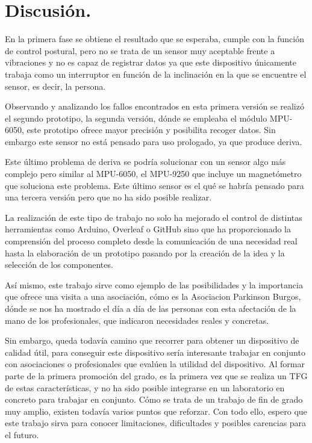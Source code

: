 \section{Discusión.}

En la primera fase se obtiene el resultado que se esperaba, cumple con la función de control postural, pero no se trata de un sensor muy aceptable frente a vibraciones y no es capaz de registrar datos ya que este dispositivo únicamente trabaja como un interruptor en función de la inclinación en la que se encuentre el sensor, es decir, la persona.

Observando y analizando los fallos encontrados en esta primera versión se realizó el segundo prototipo, la segunda versión, dónde se empleaba el módulo MPU-6050\cite{MPU6050_1,MPU6050_2}, este prototipo ofrece mayor precisión y posibilita recoger datos. Sin embargo este sensor no está pensado para uso prologado, ya que produce deriva.

Este último problema de deriva se podría solucionar con un sensor algo más complejo pero similar al MPU-6050, el MPU-9250\cite{MPU9250_1,MPU9250_2} que incluye un magnetómetro que soluciona este problema. Este último sensor es el qué se habría pensado para una tercera versión pero que no ha sido posible realizar.

La realización de este tipo de trabajo no solo ha mejorado el control de distintas herramientas como Arduino, Overleaf o GitHub sino que ha proporcionado la comprensión del proceso completo desde la comunicación de una necesidad real hasta la elaboración de un prototipo pasando por la creación de la idea y la selección de los componentes.

Así mismo, este trabajo sirve como ejemplo de las posibilidades y la importancia que ofrece una visita a una asociación, cómo es la Asociacion Parkinson Burgos\cite{ParkinsonBurgos}, dónde se nos ha mostrado el día a día de las personas con esta afectación de la mano de los profesionales, que indicaron necesidades reales y concretas. 

Sin embargo, queda todavía camino que recorrer para obtener un dispositivo de calidad útil, para conseguir este dispositivo sería interesante trabajar en conjunto con asociaciones o profesionales que evalúen la utilidad del dispositivo. Al formar parte de la primera promoción del grado, es la primera vez que se realiza un TFG de estas características, y no ha sido posible integrarse en un laboratorio en concreto para trabajar en conjunto. Cómo se trata de un trabajo de fin de grado muy amplio, existen todavía varios puntos que reforzar. Con todo ello, espero que este trabajo sirva para conocer limitaciones, dificultades y posibles carencias para el futuro.



